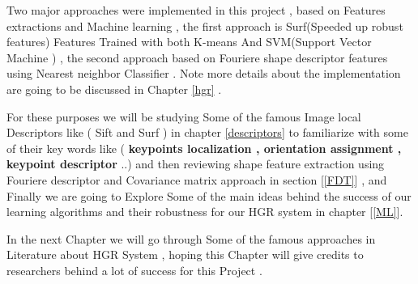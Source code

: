 Two major approaches were implemented in this project ,  based on Features extractions and Machine learning , the first approach  is  Surf(Speeded up robust features) Features Trained with both K-means And SVM(Support Vector Machine ) , the second approach  based on Fouriere  shape descriptor  features using Nearest neighbor Classifier . Note more details about the implementation are going to be discussed in Chapter \ref{hgr} .

For these purposes we will be studying  Some of the famous Image local Descriptors like ( Sift and Surf )  in chapter  \ref{descriptors}   to familiarize with some of their key words like ( \textbf{keypoints localization , orientation assignment , keypoint descriptor} ..)  and  then  reviewing shape feature extraction using Fouriere descriptor and Covariance matrix approach in  section [\ref{FDT}] , and Finally we are going to Explore  Some of the main ideas behind the success of our learning algorithms and their robustness for our HGR system  in chapter [\ref{ML}].

In the next Chapter we will go through Some of the famous approaches in  Literature about HGR  System , hoping this Chapter will give  credits  to researchers behind a lot of success for this Project .




